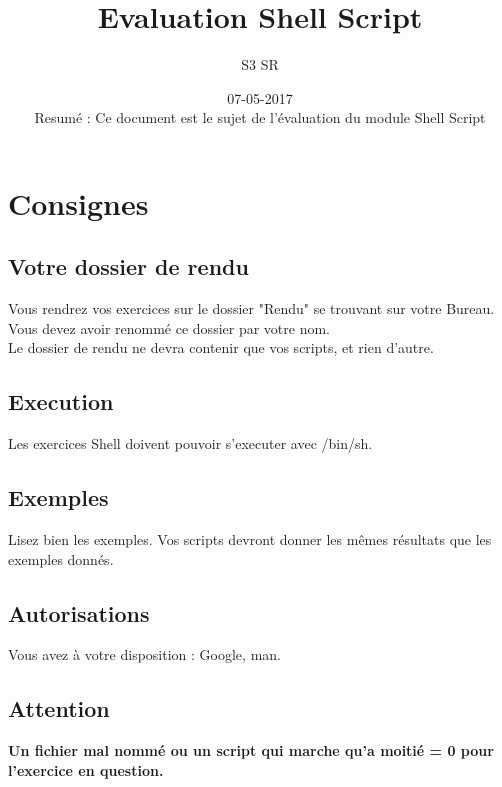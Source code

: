 \documentclass[12pt]{article}
\title{Evaluation Shell Script}
\date{07-05-2017 \\ \vspace{13cm} Resum\'e : Ce document est le sujet de l'\'evaluation du module Shell Script}
\author{S3 SR}
\begin{document}
    \maketitle
    \newpage
    \renewcommand\contentsname{}
    \tableofcontents

    \newpage
	\section{Consignes}

	\subsection{Votre dossier de rendu}
	 Vous rendrez vos exercices sur le dossier "Rendu" se trouvant sur votre Bureau.\\ Vous devez avoir renomm\'e ce dossier par votre nom. \\ 
	 Le dossier de rendu ne devra contenir que vos scripts, et rien d’autre.

	\subsection{Execution}
	 Les exercices Shell doivent pouvoir s'executer avec /bin/sh.

	\subsection{Exemples}
	 Lisez bien les exemples. Vos scripts devront donner les m\^emes r\'esultats que les exemples donn\'es.

	\subsection{Autorisations}
	Vous avez \`a votre disposition : Google, man.

	\subsection{Attention}
       	\textbf{Un fichier mal nomm\'e ou un script qui marche qu'a moiti\'e = 0 pour l'exercice en question.}
	\vspace{1cm}
\end{document}
